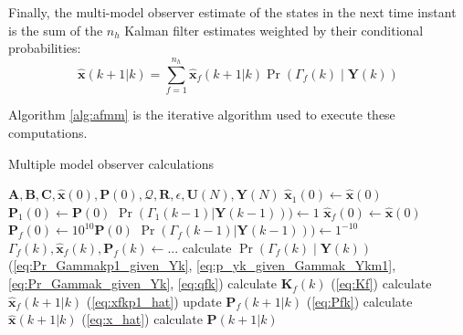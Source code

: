 Finally, the multi-model observer estimate of the states in the next time instant is the sum of the $n_h$ Kalman filter estimates weighted by their conditional probabilities:
\begin{equation} \label{eq:x_hat}
	\mathbf{\hat{x}}(k+1|k) = \sum_{f=1}^{n_h} \mathbf{\hat{x}}_f(k+1|k) \Pr(\Gamma_f(k) \mid \mathbf{Y}(k))
\end{equation}


Algorithm \ref{alg:afmm} is the iterative algorithm used to execute these computations.

\begin{algorithm}
	\caption{Multiple model observer calculations}  \label{alg:afmm}
	\begin{algorithmic}
			\Require $\mathbf{A},\mathbf{B},\mathbf{C},\mathbf{\hat{x}}(0), \mathbf{P}(0), \mathcal{Q}, \mathbf{R}, \epsilon, \mathbf{U}(N), \mathbf{Y}(N)$
			\State $\mathbf{\hat{x}}_1(0) \gets \mathbf{\hat{x}}(0)$    %
			\State $\mathbf{P}_1(0) \gets \mathbf{P}(0)$
			\State $\Pr(\Gamma_1(k-1)|\mathbf{Y}(k-1))) \gets 1$
			\State $\mathbf{\hat{x}}_f(0) \gets \mathbf{\hat{x}}(0)$
			\State $\mathbf{P}_f(0) \gets 10^{10}\mathbf{P}(0)$
			\State $\Pr(\Gamma_f(k-1)|\mathbf{Y}(k-1))) \gets 1^{-10}$
			\EndFor
			\State $\Gamma_f(k), \mathbf{\hat{x}}_f(k), \mathbf{P}_f(k) \gets ...$   %
			\State calculate $\Pr(\Gamma_f(k) \mid \mathbf{Y}(k))$ (\ref{eq:Pr_Gammakp1_given_Yk}, \ref{eq:p_yk_given_Gammak_Ykm1}, \ref{eq:Pr_Gammak_given_Yk}, \ref{eq:qfk})
			\State calculate $\mathbf{K}_f(k)$ (\ref{eq:Kf}) 
			\State calculate $\mathbf{\hat{x}}_f(k+1|k)$ (\ref{eq:xfkp1_hat})
			\State update $\mathbf{P}_f(k+1|k)$ (\ref{eq:Pfk})
			\EndFor
			\State calculate $\mathbf{\hat{x}}(k+1|k)$ (\ref{eq:x_hat}) 
			\State calculate $\mathbf{P}(k+1|k)$   %
			\EndFor
		\end{algorithmic}
\end{algorithm}

